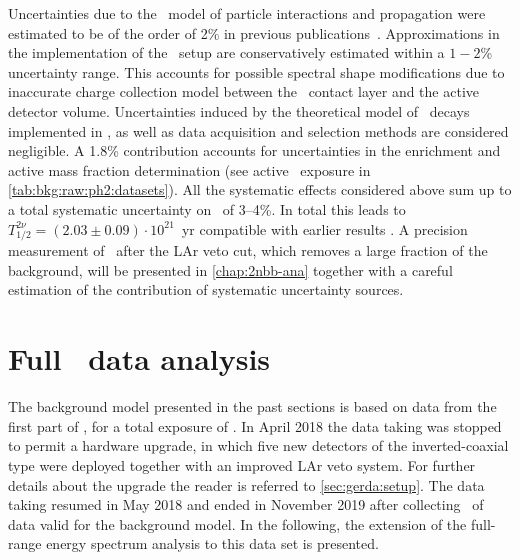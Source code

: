Uncertainties due to the \geant\ model of particle interactions and propagation were
estimated to be of the order of 2\% in previous publications~\cite{Agostini2013a,
Agostini2015a}. Approximations in the implementation of the \gerda\ setup are
conservatively estimated within a $1-2$\% uncertainty range. This accounts for possible
spectral shape modifications due to inaccurate charge collection model between the \nplus\
contact layer and the active detector volume. Uncertainties induced by the theoretical
model of \nnbb\ decays implemented in \decayzero, as well as data acquisition and
selection methods are considered negligible. A 1.8\% contribution accounts for
uncertainties in the enrichment and active mass fraction determination (see active \gesix\
exposure in \cref{tab:bkg:raw:ph2:datasets}). All the systematic effects considered above
sum up to a total systematic uncertainty on \thalftwo\ of 3--4\%. In total this leads to
$T^{2\nu}_{1/2} = (2.03 \pm 0.09) \cdot 10^{21}$~yr compatible with earlier results
\cite{Agostini2013a, Agostini2015a}. A precision measurement of \thalftwo\ after the LAr
veto cut, which removes a large fraction of the background, will be presented in
\cref{chap:2nbb-ana} together with a careful estimation of the contribution of systematic
uncertainty sources.

\section{Full \phasetwo\ data analysis}%
\label{sec:bkg:raw:ph2p}

The background model presented in the past sections is based on data from the first part
of \phasetwo, for a total exposure of \gexpophasetwobkg. In April 2018 the data taking was
stopped to permit a hardware upgrade, in which five new detectors of the inverted-coaxial
type were deployed together with an improved LAr veto system. For further details about
the upgrade the reader is referred to \cref{sec:gerda:setup}. The data taking resumed in
May 2018 and ended in November 2019 after collecting \gexpophasetwopbkg\ of data valid for
the background model. In the following, the extension of the full-range energy spectrum
analysis to this data set is presented.

